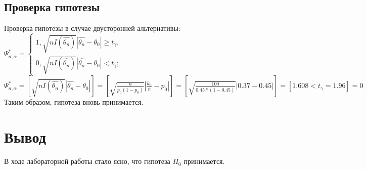 \documentclass{article}
\begin{document}
        \subsection{Проверка гипотезы}
            Проверка гипотезы в случае двусторонней альтернативы: $\Psi_{n, \alpha}^* =
            \begin{cases}
                1, \sqrt{n I(\hat{\theta_n})}|\hat{\theta_n} - \theta_0| \geq t_{\gamma},
                \\
                0, \sqrt{n I(\hat{\theta_n})}|\hat{\theta_n} - \theta_0| < t_{\gamma};
            \end{cases}$
            \newline
            $\Psi_{n, \alpha}^* = \left[ \sqrt{n I(\hat{\theta_n})}|\hat{\theta_n} - \theta_0| \right] = \left[ \sqrt{\frac{n}{p_0(1-p_0)}}|\frac{k_n}{n} - p_0| \right] = \left[ \sqrt{\frac{100}{0.45 * (1-0.45)}}|0.37 - 0.45| \right] = \left[ 1.608 < t_{\gamma} = 1.96 \right] = 0$
            \newline
            Таким образом, гипотеза вновь принимается.
    \section{Вывод}
        В ходе лабораторной работы стало ясно, что гипотеза $H_0$ принимается.
\end{document}
